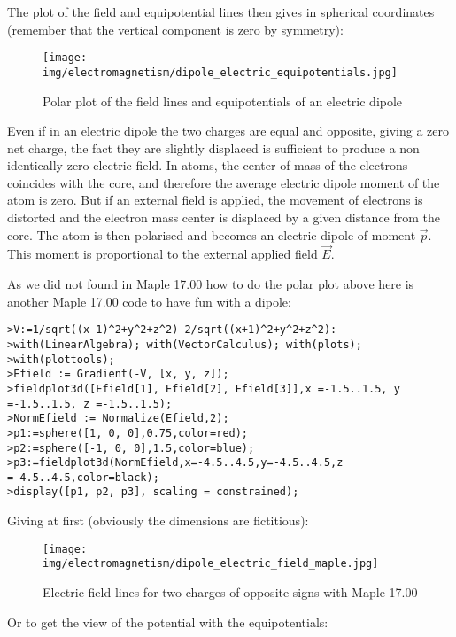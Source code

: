 	The plot of the field and equipotential lines then gives in spherical coordinates (remember that the vertical component is zero by symmetry):
	\begin{figure}[H]
		\centering
		\texttt{[image: img/electromagnetism/dipole\_electric\_equipotentials.jpg]}
		\caption{Polar plot of the field lines and equipotentials of an electric dipole}
	\end{figure}
	Even if in an electric dipole the two charges are equal and opposite, giving a zero net charge, the fact they are slightly displaced is sufficient to produce a non identically zero electric field. In atoms, the center of mass of the electrons coincides with the core, and therefore the average electric dipole moment of the atom is zero. But if an external field is applied, the movement of electrons is distorted and the electron mass center is displaced by a given distance from the core. The atom is then polarised and becomes an electric dipole of moment $\vec{p}$. This moment is proportional to the external applied field $\vec{E}$.

	As we did not found in Maple 17.00 how to do the polar plot above here is another Maple 17.00  code to have fun with a dipole:
	
	\texttt{>V:=1/sqrt((x-1)\string^2+y\string^2+z\string^2)-2/sqrt((x+1)\string^2+y\string^2+z\string^2):\\
	>with(LinearAlgebra); with(VectorCalculus); with(plots);\\
	>with(plottools);\\
	>Efield := Gradient(-V, [x, y, z]);\\
	>fieldplot3d([Efield[1], Efield[2], Efield[3]],x =-1.5..1.5, y =-1.5..1.5, z =-1.5..1.5);\\
	>NormEfield := Normalize(Efield,2);\\
	>p1:=sphere([1, 0, 0],0.75,color=red);\\
	>p2:=sphere([-1, 0, 0],1.5,color=blue);\\
	>p3:=fieldplot3d(NormEfield,x=-4.5..4.5,y=-4.5..4.5,z =-4.5..4.5,color=black);\\
	>display([p1, p2, p3], scaling = constrained);
	}

	Giving at first (obviously the dimensions are fictitious):
	\begin{figure}[H]
		\centering
		\texttt{[image: img/electromagnetism/dipole\_electric\_field\_maple.jpg]}
		\caption{Electric field lines for two charges of opposite signs with Maple 17.00}
	\end{figure}
	Or to get the view of the potential with the equipotentials:

